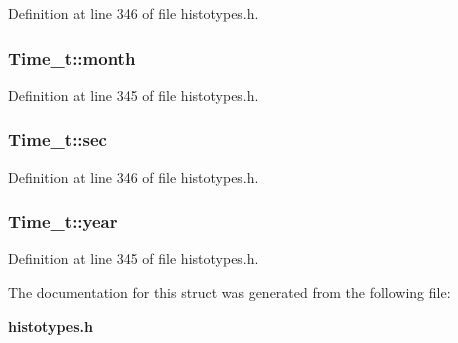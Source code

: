 Definition at line 346 of file histotypes.h.
\subsubsection{ Time\_\-t::month}\label{structTime__t_m0}




Definition at line 345 of file histotypes.h.
\subsubsection{ Time\_\-t::sec}\label{structTime__t_m5}




Definition at line 346 of file histotypes.h.
\subsubsection{ Time\_\-t::year}\label{structTime__t_m2}




Definition at line 345 of file histotypes.h.

The documentation for this struct was generated from the following file:\begin{CompactItemize}
\item 
{\bf histotypes.h}\end{CompactItemize}

